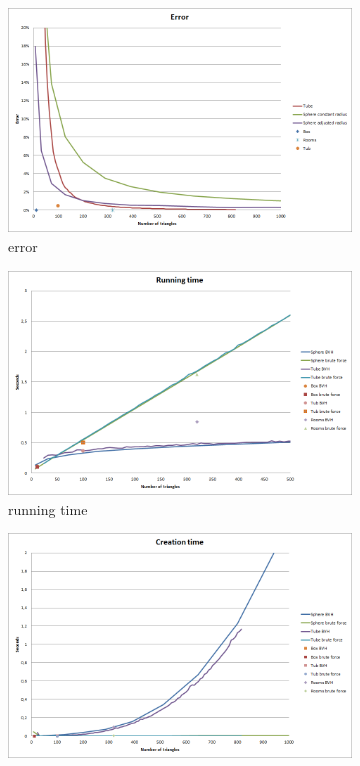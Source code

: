 \documentclass[11pt,twoside,a4paper]{report}
\begin{document}
\begin{figure}[h] \centering 
	\begin{subfigure}[h]{0.49\textwidth}
	\includegraphics[width=\textwidth]{images/chart_triangulation_error}
	\caption{error} \label{fig:sphere error} \end{subfigure}
    \begin{subfigure}[h]{0.49\textwidth}
	\includegraphics[width=\textwidth]{images/chart_triangulation_running_time}
    \caption{running time} \label{fig:sphere running time} \end{subfigure}
    \begin{subfigure}[h]{0.49\textwidth}
	\includegraphics[width=\textwidth]{images/chart_triangulation_creation_time}

\end{subfigure}
\end{figure}
\end{document}
